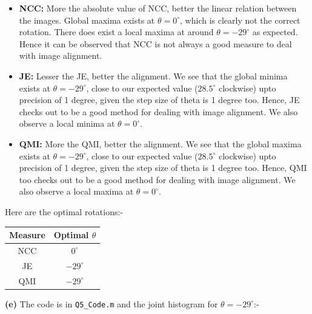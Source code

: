 \documentclass[12pt]{article}
\begin{document}
    \begin{itemize}[itemsep=0em]
        \item \textbf{NCC:} More the absolute value of NCC, better the linear relation between the images. Global maxima exists at $\theta = 0^{\circ}$, which is clearly not the correct rotation. There does exist a local maxima at around $\theta = -29^{\circ}$ as expected. Hence it can be observed that NCC is not always a good measure to deal with image alignment.
        \item \textbf{JE:} Lesser the JE, better the alignment. We see that the global minima exists at $\theta = -29^{\circ}$, close to our expected value ($28.5^{\circ}$ clockwise) upto precision of 1 degree, given the step size of theta is 1 degree too. Hence, JE checks out to be a good method for dealing with image alignment. We also observe a local minima at $\theta = 0^{\circ}$.
        \item \textbf{QMI:} More the QMI, better the alignment. We see that the global maxima exists at $\theta = -29^{\circ}$, close to our expected value ($28.5^{\circ}$ clockwise) upto precision of 1 degree, given the step size of theta is 1 degree too. Hence, QMI too checks out to be a good method for dealing with image alignment. We also observe a local maxima at $\theta = 0^{\circ}$.
    \end{itemize}
    
    \vspace{-10pt}
    
    Here are the optimal rotations:-
    
    \vspace{-10pt}
    
    \begin{table}[H]
        \centering
        \begin{tabular}{|c|c|}
            \hline
            Measure & Optimal $\theta$ \\
            \hline
            NCC & $0^{\circ}$ \\
            JE & $-29^{\circ}$ \\
            QMI & $-29^{\circ}$ \\
            \hline
        \end{tabular}
    \end{table}
    
    \vspace{-10pt}
    
    \textbf{(e)} The code is in \texttt{Q5\_Code.m} and the joint histogram for $\theta = -29^{\circ}$:-
    
\end{document}
